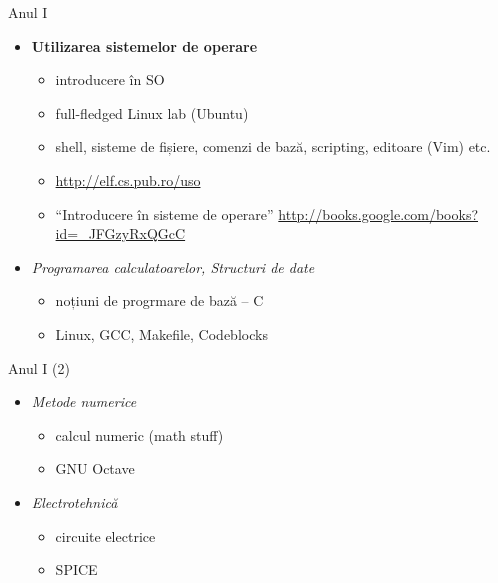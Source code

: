 \documentclass{beamer}
\begin{document}

\begin{frame}{Anul I}
	\begin{itemize}
		\item \textbf{Utilizarea sistemelor de operare}
			\begin{itemize}
				\item introducere în SO
				\item full-fledged Linux lab (Ubuntu)
				\item shell, sisteme de fișiere, comenzi de bază, scripting,
				editoare (Vim) etc.
				\item \url{http://elf.cs.pub.ro/uso}
				\item ``Introducere în sisteme de operare''
				\url{http://books.google.com/books?id=_JFGzyRxQGcC}
			\end{itemize}
		\item \textit{Programarea calculatoarelor, Structuri de date}
			\begin{itemize}
				\item noțiuni de progrmare de bază -- C
				\item Linux, GCC, Makefile, Codeblocks
			\end{itemize}
	\end{itemize}
\end{frame}

\begin{frame}{Anul I (2)}
	\begin{itemize}
		\item \textit{Metode numerice}
			\begin{itemize}
				\item calcul numeric (math stuff)
				\item GNU Octave
			\end{itemize}
		\item \textit{Electrotehnică}
			\begin{itemize}
				\item circuite electrice
				\item SPICE
			\end{itemize}
	\end{itemize}
\end{frame}
\end{document}
